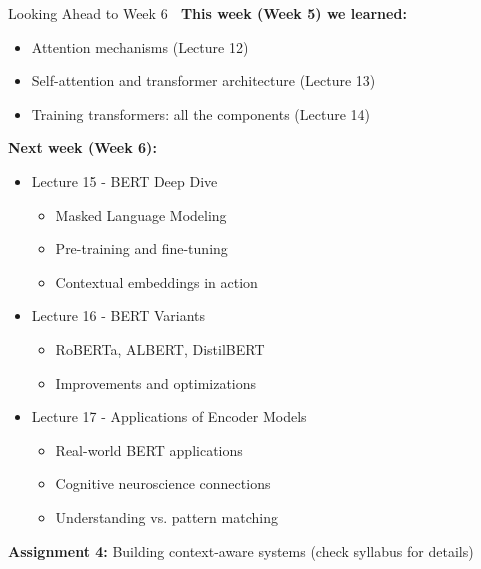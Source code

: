 \documentclass[aspectratio=169]{beamer}
\begin{document}
\begin{frame}[shrink=10]{Looking Ahead to Week 6 🔮}
\textbf{This week (Week 5) we learned:}
\begin{itemize}\setlength{\itemsep}{0pt}
    \item Attention mechanisms (Lecture 12)
    \item Self-attention and transformer architecture (Lecture 13)
    \item Training transformers: all the components (Lecture 14)
\end{itemize}

\vspace{1em}

\textbf{Next week (Week 6):}
\begin{itemize}\setlength{\itemsep}{0pt}
    \item \alert{Lecture 15 - BERT Deep Dive}
    \begin{itemize}\setlength{\itemsep}{0pt}
        \item Masked Language Modeling
        \item Pre-training and fine-tuning
        \item Contextual embeddings in action
    \end{itemize}

    \item \alert{Lecture 16 - BERT Variants}
    \begin{itemize}\setlength{\itemsep}{0pt}
        \item RoBERTa, ALBERT, DistilBERT
        \item Improvements and optimizations
    \end{itemize}

    \item \alert{Lecture 17 - Applications of Encoder Models}
    \begin{itemize}\setlength{\itemsep}{0pt}
        \item Real-world BERT applications
        \item Cognitive neuroscience connections
        \item Understanding vs. pattern matching
    \end{itemize}
\end{itemize}

\vspace{0.5em}
\textbf{Assignment 4:} Building context-aware systems (check syllabus for details)
\end{frame}
\end{document}
